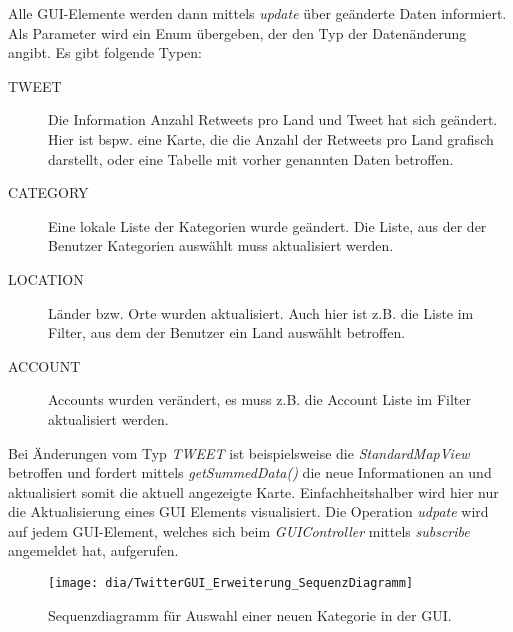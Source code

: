 Alle GUI-Elemente werden dann mittels \emph{update} über geänderte Daten informiert. Als Parameter wird ein Enum übergeben, der den Typ der Datenänderung angibt. Es gibt folgende Typen:
\begin{description}
	\item[TWEET] Die Information Anzahl Retweets pro Land und Tweet hat sich geändert. Hier ist bspw. eine Karte, die die Anzahl der Retweets pro Land grafisch darstellt, oder eine Tabelle mit vorher genannten Daten betroffen. 
	\item[CATEGORY] Eine lokale Liste der Kategorien wurde geändert. Die Liste, aus der der Benutzer Kategorien auswählt muss aktualisiert werden.
	\item[LOCATION] Länder bzw. Orte wurden aktualisiert. Auch hier ist z.B. die Liste im Filter, aus dem der Benutzer ein Land auswählt betroffen.
	\item[ACCOUNT] Accounts wurden verändert, es muss z.B. die Account Liste im Filter aktualisiert werden.
\end{description}
Bei Änderungen vom Typ \emph{TWEET} ist beispielsweise die \emph{StandardMapView} betroffen und fordert mittels \emph{getSummedData()} die neue Informationen an und aktualisiert somit die aktuell angezeigte Karte. Einfachheitshalber wird hier nur die Aktualisierung eines GUI Elements visualisiert. Die Operation \emph{udpate} wird auf jedem GUI-Element, welches sich beim \emph{GUIController} mittels \emph{subscribe} angemeldet hat, aufgerufen.
\begin{figure}[h!]
	\centering
	\texttt{[image: dia/TwitterGUI\_Erweiterung\_SequenzDiagramm]}
	\caption{Sequenzdiagramm für Auswahl einer neuen Kategorie in der GUI.}
	\label{fig:GUISeq}
\end{figure}
